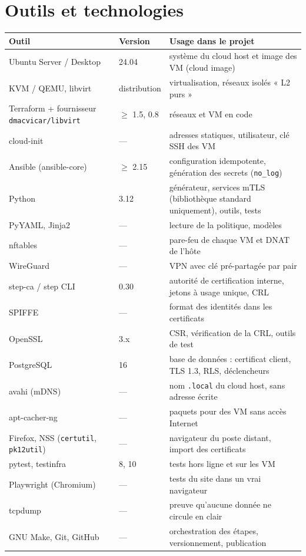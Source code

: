 \documentclass[11pt,a4paper]{article}
\newcommand{\cmd}[1]{\texttt{#1}}
\begin{document}
\section{Outils et technologies}
\begin{longtable}{@{}p{3.6cm}p{2.4cm}p{9.6cm}@{}}
\toprule
\textbf{Outil} & \textbf{Version} & \textbf{Usage dans le projet}\\
\midrule
\endhead
Ubuntu Server / Desktop & 24.04 & système du cloud host et image des VM (cloud image)\\
KVM / QEMU, libvirt & distribution & virtualisation, réseaux isolés « L2 purs »\\
Terraform + fournisseur \cmd{dmacvicar/libvirt} & $\geq$ 1.5, 0.8 & réseaux et VM en code\\
cloud-init & — & adresses statiques, utilisateur, clé SSH des VM\\
Ansible (ansible-core) & $\geq$ 2.15 & configuration idempotente, génération des secrets (\cmd{no\_log})\\
Python & 3.12 & générateur, services mTLS (bibliothèque standard uniquement), outils, tests\\
PyYAML, Jinja2 & — & lecture de la politique, modèles\\
nftables & — & pare-feu de chaque VM et DNAT de l'hôte\\
WireGuard & — & VPN avec clé pré-partagée par pair\\
step-ca / step CLI & 0.30 & autorité de certification interne, jetons à usage unique, CRL\\
SPIFFE & — & format des identités dans les certificats\\
OpenSSL & 3.x & CSR, vérification de la CRL, outils de test\\
PostgreSQL & 16 & base de données : certificat client, TLS 1.3, RLS, déclencheurs\\
avahi (mDNS) & — & nom \cmd{.local} du cloud host, sans adresse écrite\\
apt-cacher-ng & — & paquets pour des VM sans accès Internet\\
Firefox, NSS (\cmd{certutil}, \cmd{pk12util}) & — & navigateur du poste distant, import des certificats\\
pytest, testinfra & 8, 10 & tests hors ligne et sur les VM\\
Playwright (Chromium) & — & tests du site dans un vrai navigateur\\
tcpdump & — & preuve qu'aucune donnée ne circule en clair\\
GNU Make, Git, GitHub & — & orchestration des étapes, versionnement, publication\\
\bottomrule
\end{longtable}
\end{document}
